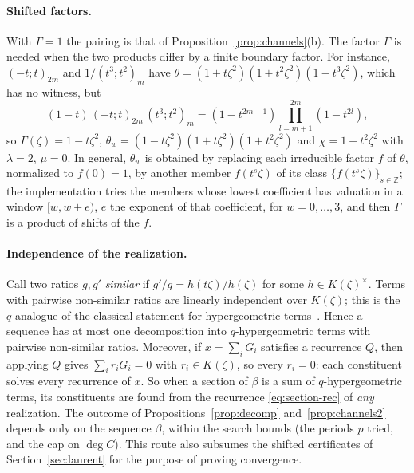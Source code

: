 \documentclass[11pt,a4paper]{article}
\theoremstyle{plain}
\theoremstyle{definition}
\theoremstyle{remark}
\begin{document}
\paragraph{Shifted factors.} With $\Gamma=1$ the pairing is that of
Proposition~\ref{prop:channels}(b). The factor $\Gamma$ is needed when the two
products differ by a finite boundary factor. For instance,
$(-t;t)_{2m}$ and $1/(t^3;t^2)_m$ have $\theta=(1+t\zeta^2)(1+t^2\zeta^2)(1-t^3\zeta^2)$,
which has no witness, but
\[
  (1-t)\,(-t;t)_{2m}\,(t^3;t^2)_m=(1-t^{2m+1})\prod_{l=m+1}^{2m}(1-t^{2l}),
\]
so $\Gamma(\zeta)=1-t\zeta^2$, $\theta_w=(1-t\zeta^2)(1+t\zeta^2)(1+t^2\zeta^2)$
and $\chi=1-t^2\zeta^2$ with $\lambda=2$, $\mu=0$. In general, $\theta_w$ is
obtained by replacing each irreducible factor $f$ of $\theta$, normalized to
$f(0)=1$, by another member $f(t^s\zeta)$ of its class
$\{f(t^s\zeta)\}_{s\in\mathbb Z}$; the implementation tries the members whose lowest coefficient
has valuation in a window $[w,w+e)$, $e$ the exponent of that coefficient, for
$w=0,\dots,3$, and then $\Gamma$ is a product of shifts of the $f$.

\paragraph{Independence of the realization.} Call two ratios $g,g'$
\emph{similar} if $g'/g=h(t\zeta)/h(\zeta)$ for some $h\in K(\zeta)^\times$.
Terms with pairwise non-similar ratios are linearly independent over
$K(\zeta)$; this is the $q$-analogue of the classical statement for
hypergeometric terms~\cite{PWZ}. Hence a sequence has at most one decomposition
into $q$-hypergeometric terms with pairwise non-similar ratios. Moreover, if
$x=\sum_iG_i$ satisfies a recurrence $Q$, then applying $Q$ gives
$\sum_ir_iG_i=0$ with $r_i\in K(\zeta)$, so every $r_i=0$: each constituent
solves every recurrence of $x$. So when a section of $\beta$ is a sum of
$q$-hypergeometric terms, its constituents are found from the recurrence
\eqref{eq:section-rec} of \emph{any} realization. The outcome of
Propositions~\ref{prop:decomp} and~\ref{prop:channels2} depends only on the
sequence $\beta$, within the search bounds (the periods $p$ tried, and the cap
on $\deg C$). This route also subsumes the shifted certificates of
Section~\ref{sec:laurent} for the purpose of proving convergence.
\end{document}
